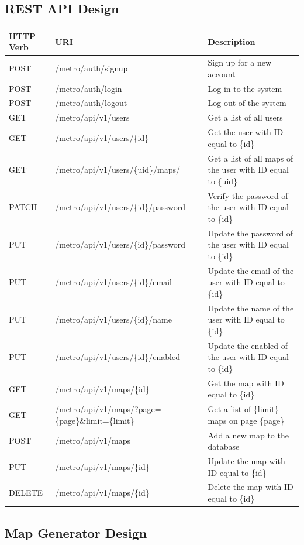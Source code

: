 \subsection{REST API Design}
\begin{table}[]
\begin{tabular}{lll}
\hline
HTTP Verb & URI & Description \\ \hline
POST & /metro/auth/signup & Sign up for a new account \\
POST & /metro/auth/login & Log in to the system \\
POST & /metro/auth/logout & Log out of the system \\ \hline
GET & /metro/api/v1/users & Get a list of all users \\
GET & /metro/api/v1/users/\{id\} & Get the user with ID equal to \{id\} \\
GET & /metro/api/v1/users/\{uid\}/maps/ & Get a list of all maps of the user with ID equal to \{uid\} \\
PATCH & /metro/api/v1/users/\{id\}/password & Verify the password of the user with ID equal to \{id\} \\
PUT & /metro/api/v1/users/\{id\}/password & Update the password of the user with ID equal to \{id\} \\
PUT & /metro/api/v1/users/\{id\}/email & Update the email of the user with ID equal to \{id\} \\
PUT & /metro/api/v1/users/\{id\}/name & Update the name of the user with ID equal to \{id\} \\
PUT & /metro/api/v1/users/\{id\}/enabled & Update the enabled of the user with ID equal to \{id\} \\ \hline
GET & /metro/api/v1/maps/\{id\} & Get the map with ID equal to \{id\} \\
GET & /metro/api/v1/maps/?page=\{page\}\&limit=\{limit\} & Get a list of \{limit\} maps on page \{page\} \\
POST & /metro/api/v1/maps & Add a new map to the database \\
PUT & /metro/api/v1/maps/\{id\} & Update the map with ID equal to \{id\} \\
DELETE & /metro/api/v1/maps/\{id\} & Delete the map with ID equal to \{id\}
\end{tabular}
\end{table}

\subsection{Map Generator Design}
